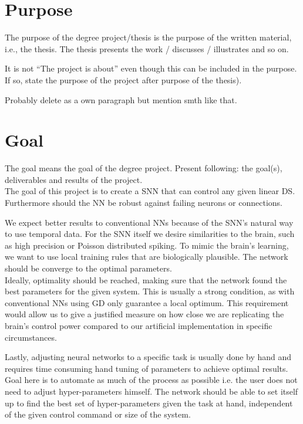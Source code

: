 \section{Purpose}
The purpose of the degree project/thesis is the purpose of the written material, i.e., the thesis. The thesis presents the work / discusses / illustrates and so on.

It is not “The project is about” even though this can be included in the purpose. If so, state the purpose of the project after purpose of the thesis).

Probably delete as a own paragraph but mention smth like that.

\section{Goal}
The goal means the goal of the degree project. Present following: the goal(s), deliverables and results of the project.\\

The goal of this project is to create a \ac{SNN} that can control any given linear \ac{DS}. Furthermore should the \ac{NN} be robust against failing neurons or connections. %

We expect better results to conventional \acp{NN} because of the \ac{SNN}'s natural way to use temporal data. For the \ac{SNN} itself we desire similarities to the brain, such as high precision or Poisson distributed spiking.
To mimic the brain's learning, we want to use local training rules that are biologically plausible. The network should be converge to the optimal parameters.\\
Ideally, optimality should be reached, making sure that the network found the best parameters for the given system. This is usually a strong condition, as with conventional \acp{NN} using \ac{GD} only guarantee a local optimum. This requirement would allow us to give a justified measure on how close we are replicating the brain's control power compared to our artificial implementation in specific circumstances.

Lastly, adjusting neural networks to a specific task is usually done by hand and requires time consuming hand tuning of parameters to achieve optimal results. Goal here is to automate as much of the process as possible i.e. the user does not need to adjust hyper-parameters himself. The network should be able to set itself up to find the best set of hyper-parameters given the task at hand, independent of the given control command or size of the system.

